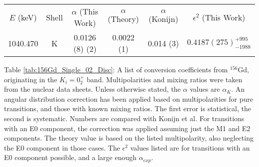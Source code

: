 \begin{table}
    \centering
    \ContinuedFloat
    \begin{subtable}{\textwidth}
    \end{subtable}
    \begin{ThreePartTable}
    \begin{subtable}{\textwidth}
        \begin{tabular}{>{\footnotesize}c|>{\footnotesize}c|>{\footnotesize}c|>{\footnotesize}c|>{\footnotesize}c|>{\footnotesize}c}
            \multicolumn{6}{>{\normalsize}c}{(b)} \\
            \toprule
            $E$ (keV)	& Shell &	$\alpha$ (This Work)	&	$\alpha$  (Theory)\citep{kibedi08:_BRICC}	&	$\alpha$ (Konijn)\citep{konijn81:_156gd}	&  $\epsilon^2$ (This Work)\\
            \hline
            1040.470	& K &	0.0126 (8) (2)	&	0.0022 (1)	&	0.014 (3)	& $0.4187(275)^{+995}_{-1988}$\\ 
            \bottomrule
        \end{tabular}
        \end{subtable}

        \makeatletter\def\TPT@hsize{}\makeatletter
        
        \begin{tablenotes}
            Table \ref{tab:156Gd_Single_02_Disc}: A list of conversion coefficients from $^{156}$Gd, originating in the $K_i=0^+_2$ band. Multipolarities and mixing ratios were taken from the nuclear data sheets\citep{reich12:_nds_156}. Unless otherwise stated, the $\alpha$ values are $\alpha_K$. An angular distribution correction has been applied based on multipolarities for pure transitions, and those with known mixing ratios. The first error is statistical, the second is systematic. Numbers are compared with Konijn et al\citep{konijn81:_156gd}. For transitions with an E0 component, the correction was applied assuming just the M1 and E2 components. The theory value is based on the listed multipolarity, also neglecting the E0 component in those cases. The $\epsilon^2$ values listed are for transitions with an E0 component possible, and a large enough $\alpha_{exp}$.
        \end{tablenotes}
\end{ThreePartTable}
\end{table}
